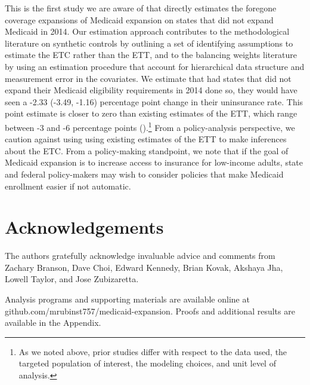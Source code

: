 \documentclass[aoas]{imsart}
\theoremstyle{plain}
\theoremstyle{remark}
\begin{document}
This is the first study we are aware of that directly estimates the foregone coverage expansions of Medicaid expansion on states that did not expand Medicaid in 2014. Our estimation approach contributes to the methodological literature on synthetic controls by outlining a set of identifying assumptions to estimate the ETC rather than the ETT, and to the balancing weights literature by using an estimation procedure that account for hierarchical data structure and measurement error in the covariates. We estimate that had states that did not expand their Medicaid eligibility requirements in 2014 done so, they would have seen a -2.33 (-3.49, -1.16) percentage point change in their uninsurance rate. This point estimate is closer to zero than existing estimates of the ETT, which range between -3 and -6 percentage points (\cite{frean2017premium}).\footnote{As we noted above, prior studies differ with respect to the data used, the targeted population of interest, the modeling choices, and unit level of analysis.} From a policy-analysis perspective, we caution against using using existing estimates of the ETT to make inferences about the ETC. From a policy-making standpoint, we note that if the goal of Medicaid expansion is to increase access to insurance for low-income adults, state and federal policy-makers may wish to consider policies that make Medicaid enrollment easier if not automatic.

\section*{Acknowledgements}

The authors gratefully acknowledge invaluable advice and comments from Zachary Branson, Dave Choi, Edward Kennedy, Brian Kovak, Akshaya Jha, Lowell Taylor, and Jose Zubizaretta.

\begin{supplement}
Analysis programs and supporting materials are available online at github.com/mrubinst757/medicaid-expansion. Proofs and additional results are available in the Appendix.
\end{supplement}

\end{document}
